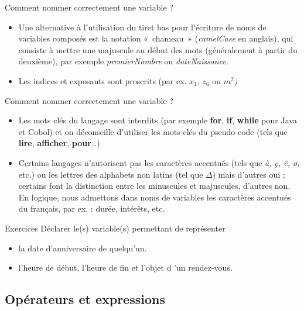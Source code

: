 \begin{frame}{Comment nommer correctement une variable ?}
	\begin{itemize}
	\item 
		Une alternative à l’utilisation du tiret bas pour l’écriture de noms de
		variables composés est la notation «~chameau~» (\textit{camelCase} en
		anglais), qui consiste à mettre une majuscule au début des mots
		(généralement à partir du deuxième), par exemple
		\textit{premierNombre} ou
		\textit{dateNaissance}.
	\item
		Les indices et exposants sont proscrits (par ex.
		\textit{$x_1$},
		\textit{$z_6$} ou
		\textit{$m^2$)}
	\end{itemize}
\end{frame}

\begin{frame}{Comment nommer correctement une variable ?}
	\begin{itemize}	
	\item
		Les mots clés du langage sont interdits (par exemple
		\textbf{for}, \textbf{if}, 
		\textbf{while }pour Java et Cobol) et on déconseille 
		d'utiliser les mots-clés du pseudo-code (tels que
		\textbf{\textsf{lire}}, 
		\textbf{\textsf{afficher}}, 
		\textbf{\textsf{pour}}…)
	\item
		Certains langages n’autorisent pas les caractères accentués (tels que
		\textit{à, ç, ê, ø,} etc.) ou les lettres des alphabets non latins
		(tel que ${\Delta}$) mais d’autres oui ; certains font la distinction
		entre les minuscules et majuscules, d’autres non. En logique, nous
		admettons dans noms de variables les caractères accentués du français,
		par ex. : durée, intérêts, etc.
	\end{itemize}
\end{frame}

\begin{frame}{Exercices}
	Déclarer le(s) variable(s) permettant de représenter 
	\begin{itemize}
		\item la date d'anniversaire de quelqu'un.
		\item l'heure de début, l'heure de fin et	l'objet d 'un rendez-vous.
	\end{itemize}
\end{frame}

\subsection{Opérateurs et expressions}

